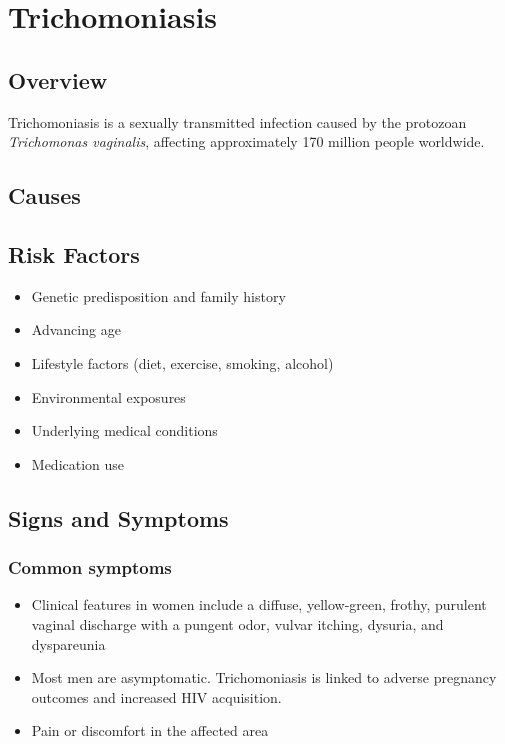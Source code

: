 \chapter{Trichomoniasis}
\label{sec:Trichomoniasis}

\section{Overview}
Trichomoniasis is a sexually transmitted infection caused by the protozoan \textit{Trichomonas vaginalis}, affecting approximately 170 million people worldwide.
\section{Causes}
\section{Risk Factors}

\begin{itemize}[noitemsep]
  \item Genetic predisposition and family history
  \item Advancing age
  \item Lifestyle factors (diet, exercise, smoking, alcohol)
  \item Environmental exposures
  \item Underlying medical conditions
  \item Medication use
\end{itemize}
\section{Signs and Symptoms}

\subsection{Common symptoms}
\begin{itemize}[noitemsep]
  \item Clinical features in women include a diffuse, yellow-green, frothy, purulent vaginal discharge with a pungent odor, vulvar itching, dysuria, and dyspareunia
  \item Most men are asymptomatic. Trichomoniasis is linked to adverse pregnancy outcomes and increased HIV acquisition.
  \item Pain or discomfort in the affected area
  \end{itemize}

